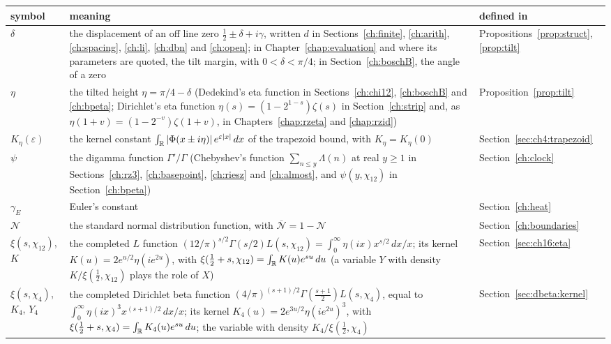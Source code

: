 {\small
\begin{longtable}{@{}p{}p{}p{}@{}}
\toprule
symbol & meaning & defined in\\
\midrule
\endhead
$\delta$ & \raggedright the displacement of an off line zero ${\frac12\pm\delta+i\gamma}$, written $d$ in Sections~\ref{ch:finite}, \ref{ch:arith}, \ref{ch:spacing}, \ref{ch:li}, \ref{ch:dbn} and \ref{ch:open}; in Chapter~\ref{chap:evaluation} and where its parameters are quoted, the tilt margin, with ${0<\delta<\pi/4}$; in Section~\ref{ch:boschB}, the angle of a zero & \raggedright Propositions~\ref{prop:struct}, \ref{prop:tilt}\tabularnewline
$\eta$ & \raggedright the tilted height ${\eta=\pi/4-\delta}$ (Dedekind's eta function in Sections~\ref{ch:chi12}, \ref{ch:boschB} and \ref{ch:bpeta}; Dirichlet's eta function ${\eta(s)=(1-2^{1-s})\zeta(s)}$ in Section~\ref{ch:strip} and, as ${\eta(1+v)=(1-2^{-v})\zeta(1+v)}$, in Chapters~\ref{chap:rzeta} and \ref{chap:rzid}) & \raggedright Proposition~\ref{prop:tilt}\tabularnewline
$K_\eta(\varepsilon)$ & \raggedright the kernel constant ${\int_{\mathbb{R}}|\Phi(x\pm i\eta)|\,e^{\varepsilon|x|}\,dx}$ of the trapezoid bound, with ${K_\eta=K_\eta(0)}$ & \raggedright Section~\ref{sec:ch4:trapezoid}\tabularnewline
$\psi$ & \raggedright the digamma function $\Gamma'/\Gamma$ (Chebyshev's function ${\sum_{n\le y}\Lambda(n)}$ at real ${y\ge1}$ in Sections~\ref{ch:rz3}, \ref{ch:basepoint}, \ref{ch:riesz} and \ref{ch:almost}, and $\psi(y,\chi_{12})$ in Section~\ref{ch:bpeta}) & \raggedright Section~\ref{ch:clock}\tabularnewline
$\gamma_E$ & \raggedright Euler's constant & \raggedright Section~\ref{ch:heat}\tabularnewline
$\mathcal N$ & \raggedright the standard normal distribution function, with ${\overline{\mathcal N}=1-\mathcal N}$ & \raggedright Section~\ref{ch:boundaries}\tabularnewline
$\xi(s,\chi_{12})$, $K$ & \raggedright the completed $L$ function ${(12/\pi)^{s/2}\Gamma(s/2)L(s,\chi_{12})=\int_0^\infty\eta(ix)x^{s/2}\,dx/x}$; its kernel ${K(u)=2e^{u/2}\eta(ie^{2u})}$, with ${\xi(\frac12+s,\chi_{12})=\int_{\mathbb{R}}K(u)e^{su}\,du}$ (a variable $Y$ with density $K/\xi(\frac12,\chi_{12})$ plays the role of $X$) & \raggedright Section~\ref{sec:ch16:eta}\tabularnewline
$\xi(s,\chi_4)$, $K_4$, $Y_4$ & \raggedright the completed Dirichlet beta function ${(4/\pi)^{(s+1)/2}\Gamma(\frac{s+1}2)L(s,\chi_4)}$, equal to ${\int_0^\infty\eta(ix)^3x^{(s+1)/2}\,dx/x}$; its kernel ${K_4(u)=2e^{3u/2}\eta(ie^{2u})^3}$, with ${\xi(\frac12+s,\chi_4)=\int_{\mathbb{R}}K_4(u)e^{su}\,du}$; the variable with density $K_4/\xi(\frac12,\chi_4)$ & \raggedright Section~\ref{sec:dbeta:kernel}\tabularnewline

\end{longtable}}
